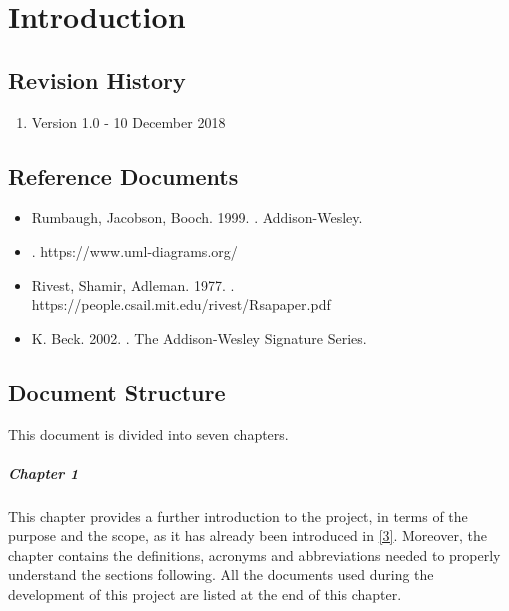 \documentclass[../DD.tex]{subfiles}
\begin{document}
\chapter{Introduction}
\thispagestyle{fancy}
		
		
		
		
		
		\section{Revision History}
		\begin{enumerate}
			\item Version 1.0 - 10 December 2018
		\end{enumerate}
		
		\section{Reference Documents\label{sect:1.5}}
			\begin{itemize}
				\item Rumbaugh, Jacobson, Booch. 1999. . Addison-Wesley.
				\item {}. https://www.uml-diagrams.org/
				\item Rivest, Shamir, Adleman. 1977. . https://people.csail.mit.edu/rivest/Rsapaper.pdf
				\item K. Beck. 2002. . The Addison-Wesley Signature Series.
			\end{itemize}
			
		\section{Document Structure}
		This document is divided into seven chapters.
		
		\paragraph{Chapter 1}
			This chapter provides a further introduction to the project, in terms of the purpose and the scope, as it has already been introduced in \hyperref[ref:3]{[3]}. Moreover, the chapter contains the definitions, acronyms and abbreviations needed to properly understand the sections following. All the documents used during the development of this project are listed at the end of this chapter.
\end{document}
